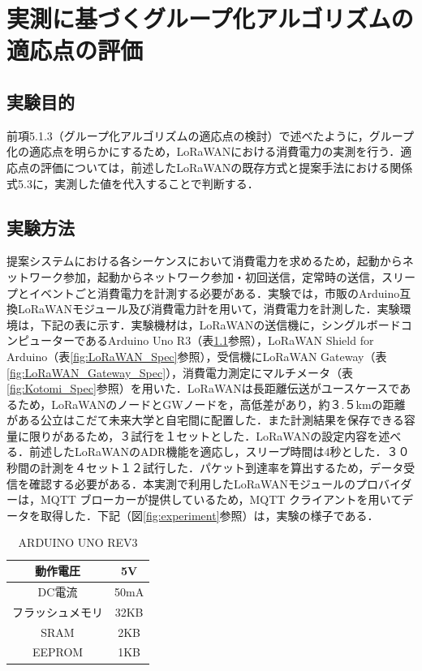 \chapter{実測に基づくグループ化アルゴリズムの適応点の評価}

\section{実験目的}
前項5.1.3（グループ化アルゴリズムの適応点の検討）で述べたように，グループ化の適応点を明らかにするため，LoRaWANにおける消費電力の実測を行う．適応点の評価については，前述したLoRaWANの既存方式と提案手法における関係式5.3に，実測した値を代入することで判断する．

\section{実験方法}
提案システムにおける各シーケンスにおいて消費電力を求めるため，起動からネットワーク参加，起動からネットワーク参加・初回送信，定常時の送信，スリープとイベントごと消費電力を計測する必要がある．実験では，市販のArduino互換LoRaWANモジュール及び消費電力計を用いて，消費電力を計測した．実験環境は，下記の表に示す．実験機材は，LoRaWANの送信機に，シングルボードコンピューターであるArduino Uno R3（表\ref{fig:Arduino_Spec}参照），LoRaWAN Shield for Arduino\cite{lorashield}（表\ref{fig:LoRaWAN_Spec}参照），受信機にLoRaWAN Gateway\cite{loragateway}（表\ref{fig:LoRaWAN_Gateway_Spec}），消費電力測定にマルチメータ\cite{kotomi}（表\ref{fig:Kotomi_Spec}参照）を用いた．LoRaWANは長距離伝送がユースケースであるため，LoRaWANのノードとGWノードを，高低差があり，約３.５kmの距離がある公立はこだて未来大学と自宅間に配置した．また計測結果を保存できる容量に限りがあるため，３試行を１セットとした．LoRaWANの設定内容を述べる．前述したLoRaWANのADR機能を適応し，スリープ時間は4秒とした．３０秒間の計測を４セット１２試行した．パケット到達率を算出するため，データ受信を確認する必要がある．本実測で利用したLoRaWANモジュールのプロバイダーは，MQTT ブローカーが提供しているため，MQTT クライアント\cite{mqtttool}を用いてデータを取得した．下記（図\ref{fig:experiment}参照）は，実験の様子である．

\begin{table}[]
    \caption{ARDUINO UNO REV3}\label{fig:Arduino_Spec}
    \centering
    \begin{tabular}{|c|c|}
    \hline
    動作電圧     & 5V   \\ \hline
    DC電流     & 50mA \\ \hline
    フラッシュメモリ & 32KB \\ \hline
    SRAM     & 2KB  \\ \hline
    EEPROM   & 1KB  \\ \hline
    \end{tabular}
\end{table}

